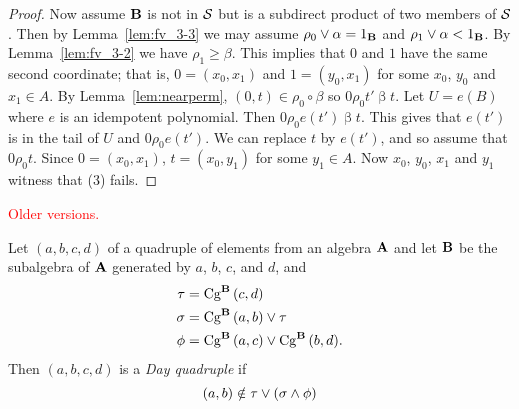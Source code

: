 \begin{proof}
Now assume $\mathbf{B}$ is not in $\mathcal{S}$ but is a subdirect 
product of two members of $\mathcal{S}$.
Then
by Lemma~\ref{lem:fv_3-3} we may 
assume $\rho_0 \join \alpha = 1_{\alg B}$ and
$\rho_1 \join \alpha < 1_{\alg B}$. By Lemma~\ref{lem:fv_3-2}
we have $\rho_1 \ge \beta$.
This implies that $0$ and $1$ have the same second coordinate; that is,
$0 = (x_0,x_1)$ and $1 = (y_0,x_1)$ for some $x_0$, $y_0$ and $x_1\in A$.
By Lemma~\ref{lem:nearperm}, $(0,t) \in \rho_0 \circ \beta$
so $0 \mathrel {\rho_0} t' \mathrel{\beta} t$. Let $U = e(B)$
where $e$ is an idempotent polynomial. Then
$0 \mathrel {\rho_0} e(t') \mathrel{\beta} t$. This gives
that $e(t')$ is in the tail of $U$ and 
$0 \mathrel{\rho_0} e(t')$. We can
replace $t$ by $e(t')$, and so assume that 
$0 \mathrel{\rho_0} t$.
Since $0 = (x_0,x_1)$, $t = (x_0,y_1)$ for some $y_1\in A$. 
Now
$x_0$, $y_0$, $x_1$ and $y_1$ witness that (3) fails.
\end{proof}








\textcolor{red}{Older versions.}

Let $(a,b,c,d)$ of a quadruple of elements from an 
algebra $\mathbf{A}$ and let $\mathbf{B}$ be the subalgebra of
$\mathbf{A}$ generated by $a$, $b$, $c$, and $d$, and
\begin{align}
\tau &= \Cga c d B \notag \\
\sigma &= \Cga a b B \join \tau \label{quad}\\
\phi &= \Cga a c B \join \Cga b d B. \notag
\end{align}
Then $(a,b,c,d)$ is a \emph{Day quadruple} if
\begin{equation}\label{dayQ}
   (a,b)  \notin \tau \join (\sigma \meet \phi)
\end{equation}

